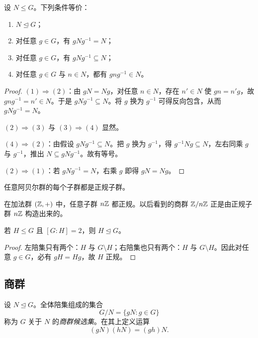 \begin{proposition}[正规性的等价刻画]
设 $N\le G$。下列条件等价：
\begin{enumerate}[label=\textnormal{(\arabic*)}, leftmargin=3em]
  \item $N\trianglelefteq G$；
  \item 对任意 $g\in G$，有 $gNg^{-1}=N$；
  \item 对任意 $g\in G$，有 $gNg^{-1}\subseteq N$；
  \item 对任意 $g\in G$ 与 $n\in N$，都有 $gng^{-1}\in N$。
\end{enumerate}
\end{proposition}

\begin{proof}
$(1)\Rightarrow(2)$：由 $gN=Ng$，对任意 $n\in N$，存在 $n'\in N$ 使 $gn=n'g$，故 $gng^{-1}=n'\in N$。于是 $gNg^{-1}\subseteq N$。将 $g$ 换为 $g^{-1}$ 可得反向包含，从而 $gNg^{-1}=N$。

$(2)\Rightarrow(3)$ 与 $(3)\Rightarrow(4)$ 显然。

$(4)\Rightarrow(2)$：由假设 $gNg^{-1}\subseteq N$。把 $g$ 换为 $g^{-1}$，得 $g^{-1}Ng\subseteq N$，左右同乘 $g$ 与 $g^{-1}$，推出 $N\subseteq gNg^{-1}$。故有等号。

$(2)\Rightarrow(1)$：若 $gNg^{-1}=N$，右乘 $g$ 即得 $gN=Ng$。
\end{proof}

\begin{example}
任意阿贝尔群的每个子群都是正规子群。
\end{example}

\begin{example}
在加法群 $(\mathbb{Z},+)$ 中，任意子群 $n\mathbb{Z}$ 都正规。以后看到的商群 $\mathbb{Z}/n\mathbb{Z}$ 正是由正规子群 $n\mathbb{Z}$ 构造出来的。
\end{example}

\begin{proposition}
若 $H\le G$ 且 $[G:H]=2$，则 $H\trianglelefteq G$。
\end{proposition}

\begin{proof}
左陪集只有两个：$H$ 与 $G\setminus H$；右陪集也只有两个：$H$ 与 $G\setminus H$。因此对任意 $g\in G$，必有 $gH=Hg$，故 $H$ 正规。
\end{proof}

\subsection*{商群}

\begin{definition}
设 $N\trianglelefteq G$。全体陪集组成的集合
\[
 G/N=\{gN:g\in G\}
\]
称为 $G$ 关于 $N$ 的\emph{商群候选集}。在其上定义运算
\[
 (gN)(hN)=(gh)N.
\]
\end{definition}

